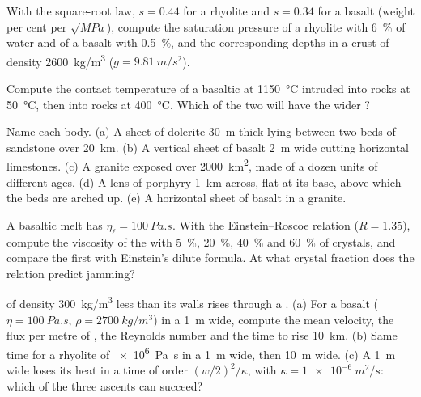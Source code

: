\begin{exercise}[$\star$]\label{exo:b2:magma-emplacement:2}
With the square-root law, $s = 0.44$ for a rhyolite and $s = 0.34$ for a basalt
(weight per cent per $\sqrt{\unit{MPa}}$), compute the saturation pressure of a
rhyolite with \qty{6}{\percent} of water and of a basalt with \qty{0.5}{\percent},
and the corresponding depths in a crust of density \qty{2600}{kg/m^3}
($g = \qty{9.81}{m/s^2}$).
\end{exercise}

\begin{exercise}[$\star$]\label{exo:b2:magma-emplacement:3}
Compute the contact temperature of a basaltic  at \qty{1150}{\celsius}
intruded into rocks at \qty{50}{\celsius}, then into rocks at
\qty{400}{\celsius}. Which of the two  will have the wider ?
\end{exercise}

\begin{exercise}[$\star$]\label{exo:b2:magma-emplacement:4}
Name each body. (a) A sheet of dolerite \qty{30}{m} thick lying between two beds
of sandstone over \qty{20}{km}. (b) A vertical sheet of basalt \qty{2}{m} wide
cutting horizontal limestones. (c) A granite exposed over \qty{2000}{km^2},
made of a dozen units of different ages. (d) A lens of porphyry \qty{1}{km} across,
flat at its base, above which the beds are arched up. (e) A horizontal sheet
of basalt in a granite.
\end{exercise}

\begin{exercise}[$\star\star$]\label{exo:b2:magma-emplacement:5}
A basaltic melt has $\eta_{\ell} = \qty{100}{Pa.s}$. With the Einstein--Roscoe
relation ($R = 1.35$), compute the viscosity of the  with
\qty{5}{\percent}, \qty{20}{\percent}, \qty{40}{\percent} and \qty{60}{\percent} of
crystals, and compare the first with Einstein's dilute formula. At what crystal
fraction does the relation predict jamming?
\end{exercise}

\begin{exercise}[$\star\star$]\label{exo:b2:magma-emplacement:6}
 of density \qty{300}{kg/m^3} less than its walls rises through a .
(a) For a basalt ($\eta = \qty{100}{Pa.s}$, $\rho = \qty{2700}{kg/m^3}$) in a 
\qty{1}{m} wide, compute the mean velocity, the flux per metre of , the
Reynolds number and the time to rise \qty{10}{km}. (b) Same time for a rhyolite of
\qty{e6}{Pa.s} in a  \qty{1}{m} wide, then \qty{10}{m} wide. (c) A 
\qty{1}{m} wide loses its heat in a time of order $(w/2)^2/\kappa$, with $\kappa =
\qty{1e-6}{m^2/s}$: which of the three ascents can succeed?
\end{exercise}

